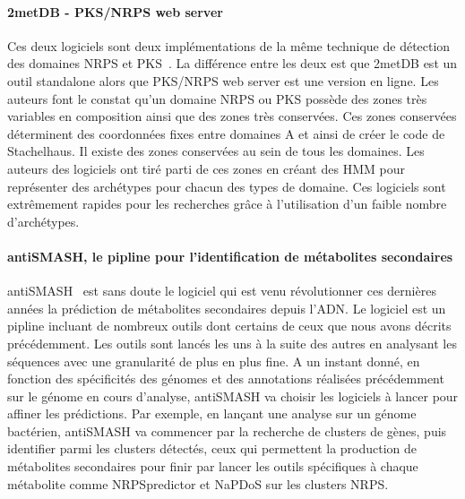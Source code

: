 \documentclass[12pt,french,twoside]{report}
\begin{document}
\paragraph{2metDB - PKS/NRPS web server}
Ces deux logiciels sont deux implémentations de la même technique de détection des domaines NRPS et PKS~\cite{bachmann_chapter_2009}.
La différence entre les deux est que 2metDB est un outil standalone alors que PKS/NRPS web server est une version en ligne.
Les auteurs font le constat qu'un domaine NRPS ou PKS possède des zones très variables en composition ainsi que des zones très conservées.
Ces zones conservées déterminent des coordonnées fixes entre domaines A et ainsi de créer le code de Stachelhaus.
Il existe des zones conservées au sein de tous les domaines.
Les auteurs des logiciels ont tiré parti de ces zones en créant des HMM pour représenter des archétypes pour chacun des types de domaine.
Ces logiciels sont extrêmement rapides pour les recherches grâce à l'utilisation d'un faible nombre d'archétypes.


\label{antismash}
\paragraph{antiSMASH, le pipline pour l'identification de métabolites secondaires}
antiSMASH~\cite{weber_antismash_2015,medema_antismash:_2011} est sans doute le logiciel qui est venu révolutionner ces dernières années la prédiction de métabolites secondaires depuis l'ADN.
Le logiciel est un pipline incluant de nombreux outils dont certains de ceux que nous avons décrits précédemment.
Les outils sont lancés les uns à la suite des autres en analysant les séquences avec une granularité de plus en plus fine.
A un instant donné, en fonction des spécificités des génomes et des annotations réalisées précédemment sur le génome en cours d'analyse, antiSMASH va choisir les logiciels à lancer pour affiner les prédictions.
Par exemple, en lançant une analyse sur un génome bactérien, antiSMASH va commencer par la recherche de clusters de gènes, puis identifier parmi les clusters détectés, ceux qui permettent la production de métabolites secondaires pour finir par lancer les outils spécifiques à chaque métabolite comme NRPSpredictor et NaPDoS sur les clusters NRPS.
\end{document}
